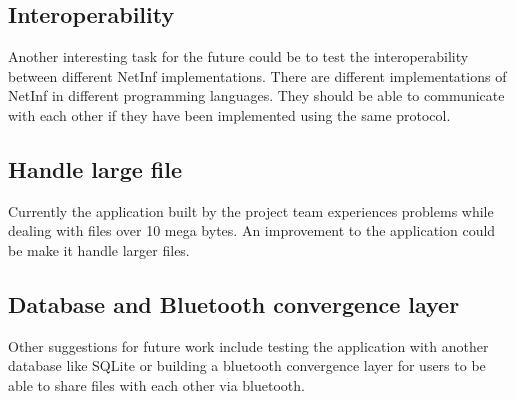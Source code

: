 \subsection{Interoperability}

Another interesting task for the future could be to test the interoperability between different NetInf implementations. There are different implementations of NetInf in different programming languages. They should be able to communicate with each other if they have been implemented using the same protocol. 

\subsection{Handle large file}

Currently the application built by the project team experiences problems while dealing with files over 10 mega bytes. An improvement to the application could be make it handle larger files.

\subsection{Database and Bluetooth convergence layer}

Other suggestions for future work include testing the application with another database like SQLite or building a bluetooth convergence layer for users to be able to share files with each other via bluetooth. 